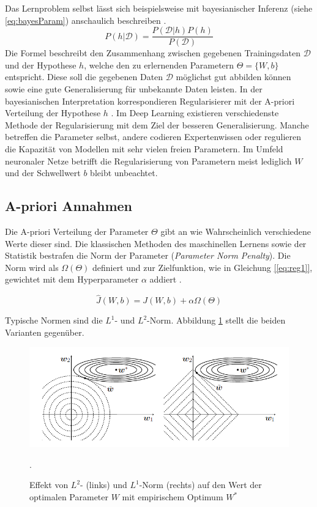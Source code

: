 Das Lernproblem selbst lässt sich beispielsweise mit bayesianischer Inferenz (siehe \ref{eq:bayesParam}) anschaulich beschreiben \cite[vgl. im Folgenden][S. 159f]{Mitchell1997}.
\begin{equation}
\label{eq:bayesParam}
P(h|\mathcal{D}) = \frac{P(\mathcal{D}|h)P(h)}{P(\mathcal{D})}
\end{equation}
Die Formel beschreibt den Zusammenhang zwischen gegebenen Trainingsdaten $\mathcal{D}$ und der Hypothese $h$, welche den zu erlernenden Parametern  $\Theta = \{W,b\} $ entspricht. Diese soll die gegebenen Daten $\mathcal{D}$ möglichst gut abbilden können sowie eine gute Generalisierung für unbekannte Daten leisten. In der bayesianischen Interpretation korrespondieren Regularisierer mit der A-priori Verteilung der Hypothese $h$ \cite[vgl. im Folgenden][Kap. 7, S. 196]{Bengio2015}.
Im Deep Learning existieren verschiedenste Methode der Regularisierung mit dem Ziel der besseren Generalisierung. Manche betreffen die Parameter selbst, andere codieren Expertenwissen oder regulieren die Kapazität von Modellen mit sehr vielen freien Parametern. 
Im Umfeld neuronaler Netze betrifft die Regularisierung von Parametern meist lediglich $W$ und der Schwellwert $b$ bleibt unbeachtet.
					

\subsection{A-priori Annahmen}

Die A-priori Verteilung der Parameter $\Theta$ gibt an wie Wahrscheinlich verschiedene Werte dieser sind. Die klassischen Methoden des maschinellen Lernens sowie der Statistik bestrafen die Norm der Parameter (\textit{Parameter Norm Penalty}). Die Norm wird als $\Omega(\Theta)$ definiert und zur Zielfunktion, wie in Gleichung \ref{[eq:reg1]}, gewichtet mit dem Hyperparameter $\alpha$ addiert \cite[vgl.][Kap. 7.2, S. 200]{Bengio2015}. 

\begin{equation}
\label{[eq:reg1]}
\hat{J}(W,b) =  J(W,b) + \alpha \Omega(\Theta)
\end{equation}

Typische Normen sind die $L^1$- und $L^2$-Norm. Abbildung \ref{fig:4_regularizer} stellt die beiden Varianten gegenüber.

\begin{figure}
\centering
\includegraphics[width=0.8\linewidth]{images/4_regularizer}
\caption[]{Effekt von $L^2$- (links) und $L^1$-Norm (rechts) auf den Wert der optimalen Parameter $W$ mit empirischem Optimum $W^*$ \cite[vgl.][Kap. 7.2, S. 199]{Bengio2015} }.
\label{fig:4_regularizer}
\end{figure}


